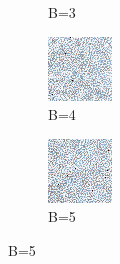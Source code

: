\begin{figure}[H]
\begin{subfigure}[b]{0.2\linewidth}
         \caption{B=3}
         \label{pic:screen_B3}
    \end{subfigure}
    \begin{subfigure}[b]{0.2\linewidth}
        \includegraphics[width=\linewidth]{content/TemporalerAlg/Bilder/Sorting/DiffDimensions/4/seed_debug_5.0_small_screen.png}
         \caption{B=4}
         \label{pic:screen_B4}
    \end{subfigure}
    \begin{subfigure}[b]{0.2\linewidth}
        \includegraphics[width=\linewidth]{content/TemporalerAlg/Bilder/Sorting/DiffDimensions/5/seed_debug_5.0_small_screen.png}
         \caption{B=5}
         \label{pic:screen_B5}
    \end{subfigure}


\end{figure}
